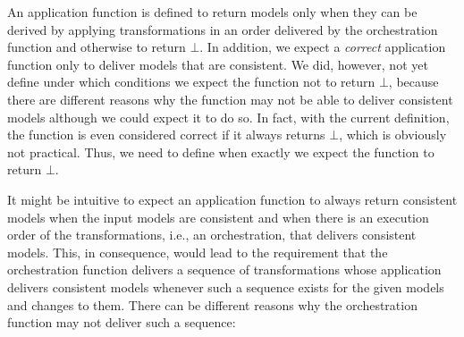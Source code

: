An application function is defined to return models only when they can be derived by applying transformations in an order delivered by the orchestration function and otherwise to return $\bot$.
In addition, we expect a \emph{correct} application function only to deliver models that are consistent.
We did, however, not yet define under which conditions we expect the function not to return $\bot$, because there are different reasons why the function may not be able to deliver consistent models although we could expect it to do so.
In fact, with the current definition, the function is even considered correct if it always returns $\bot$, which is obviously not practical.
Thus, we need to define when exactly we expect the function to return $\bot$.

It might be intuitive to expect an application function to always return consistent models when the input models are consistent and when there is an execution order of the transformations, i.e., an orchestration, that delivers consistent models.
This, in consequence, would lead to the requirement that the orchestration function delivers a sequence of transformations whose application delivers consistent models whenever such a sequence exists for the given models and changes to them.
There can be different reasons why the orchestration function may not deliver such a sequence:
